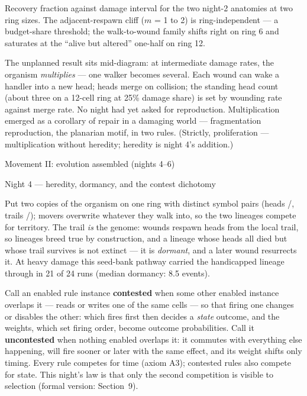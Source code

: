 \medskip\centerline{\picw=10.5cm }
\smallskip{} Recovery fraction against
damage interval for the two night-2 anatomies at two ring sizes.
The adjacent-respawn cliff ($m$ = 1 to 2) is ring-independent ---
a budget-share threshold; the walk-to-wound family shifts right on
ring 6 and saturates at the “alive but altered” one-half on
ring 12.
\medskip

The unplanned result sits mid-diagram: at intermediate damage
rates, the organism {\it multiplies} --- one walker becomes
several. Each wound can wake a handler into a new
head; heads merge on collision; the standing head count (about
three on a 12-cell ring at 25\% damage share) is set by wounding
rate against merge rate. No night had yet asked for reproduction.
Multiplication emerged as a corollary of repair in a damaging
world --- fragmentation reproduction, the planarian motif, in two rules.
(Strictly, proliferation --- multiplication without heredity;
heredity is night 4's addition.)

\sec Movement II: evolution assembled (nights 4--6)

\secc Night 4 --- heredity, dormancy, and the contest dichotomy

Put two copies of the organism on one ring with distinct symbol
pairs (heads /, trails /); movers overwrite
whatever they walk into, so the two lineages compete for territory.
The trail {\it is} the genome: wounds respawn heads from the local
trail, so lineages breed true by construction, and a lineage whose
heads all died but whose trail survives is not extinct --- it is
{\it dormant}, and a later wound resurrects it. At heavy damage
this seed-bank pathway carried the handicapped lineage through in
21 of 24 runs (median dormancy: 8.5 events).

Call an enabled rule instance {\bf contested} when some other
enabled instance overlaps it --- reads or writes one of the same
cells --- so that firing one changes or disables the other: which
fires first then decides a {\it state} outcome, and the weights,
which set firing order, become outcome probabilities. Call it
{\bf uncontested} when nothing enabled overlaps it: it commutes
with everything else happening, will fire sooner or later with
the same effect, and its weight shifts only timing. Every rule
competes for time (axiom A3); contested rules also compete for
state. This night's law is that only the second competition is
visible to selection (formal version: Section~9).

